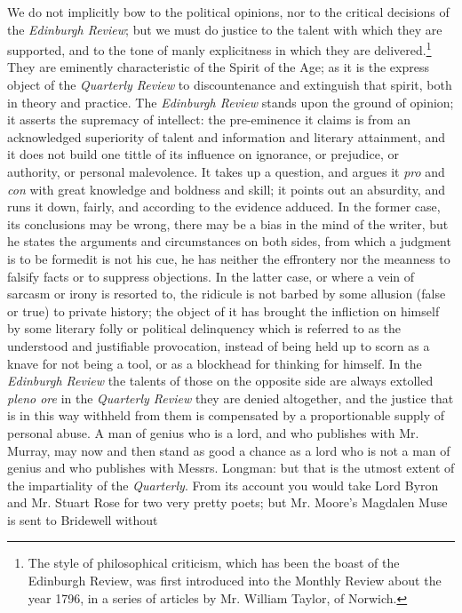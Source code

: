 We do not implicitly bow to the political opinions, nor to the
critical decisions of the \emph{Edinburgh Review}; but we must do
justice to the talent with which they are supported, and to the
tone of manly explicitness in which they are
delivered.\footnote{The style of philosophical criticism, which
  has been the boast of the Edinburgh Review, was first introduced
  into the Monthly Review about the year 1796, in a series of
  articles by Mr. William Taylor, of Norwich.} They are eminently
characteristic of the Spirit of the Age; as it is the express
object of the \emph{Quarterly Review} to discountenance and
extinguish that spirit, both in theory and practice. The
\emph{Edinburgh Review} stands upon the ground of opinion; it
asserts the supremacy of intellect: the pre-eminence it claims is
from an acknowledged superiority of talent and information and
literary attainment, and it does not build one tittle of its
influence on ignorance, or prejudice, or authority, or personal
malevolence. It takes up a question, and argues it \emph{pro} and
\emph{con} with great knowledge and boldness and skill; it points
out an absurdity, and runs it down, fairly, and according to the
evidence adduced. In the former case, its conclusions may be
wrong, there may be a bias in the mind of the writer, but he
states the arguments and circumstances on both sides, from which a
judgment is to be formed\textemdash it is not his cue, he has
neither the effrontery nor the meanness to falsify facts or to
suppress objections. In the latter case, or where a vein of
sarcasm or irony is resorted to, the ridicule is not barbed by
some allusion (false or true) to private history; the object of it
has brought the infliction on himself by some literary folly or
political delinquency which is referred to as the understood and
justifiable provocation, instead of being held up to scorn as a
knave for not being a tool, or as a blockhead for thinking for
himself. In the \emph{Edinburgh Review} the talents of those on
the opposite side are always extolled \emph{pleno ore}\textemdash
in the \emph{Quarterly Review} they are denied altogether, and the
justice that is in this way withheld from them is compensated by a
proportionable supply of personal abuse. A man of genius who is a
lord, and who publishes with Mr. Murray, may now and then stand as
good a chance as a lord who is not a man of genius and who
publishes with Messrs. Longman: but that is the utmost extent of
the impartiality of the \emph{Quarterly}. From its account you
would take Lord Byron and Mr.  Stuart Rose for two very pretty
poets; but Mr. Moore's Magdalen Muse is sent to Bridewell without
